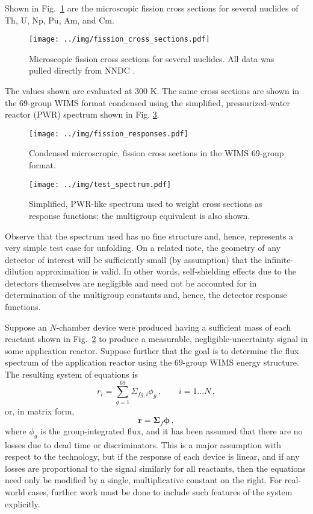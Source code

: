 \documentclass[journal]{IEEEtran}
\newcommand{\FIG}[1]{Fig.~\ref{#1}}               %
\begin{document}
Shown in \FIG{fig:reactants} are the microscopic fission cross sections for several nuclides of Th, U, Np, Pu, Am, and Cm.  
\begin{figure}[h!tb]
  \centering
  \texttt{[image: ../img/fission\_cross\_sections.pdf]}
  \caption{Microscopic fission cross sections for several nuclides.  All data was pulled directly from NNDC \cite{nndc}.}
  \label{fig:reactants}
\end{figure}
The values shown are evaluated at 300 K.  The same cross sections are shown in the 69-group WIMS \cite{stammler1984methods} format condensed using the simplified, pressurized-water reactor (PWR)  spectrum shown in Fig. \ref{fig:spectra}.  
\begin{figure}[h!tb]
  \centering
  \texttt{[image: ../img/fission\_responses.pdf]}
  \caption{Condensed microscropic, fission cross sections  in the WIMS 69-group format.}
  \label{fig:response}
\end{figure}
\begin{figure}[h!tb]
  \centering
  \texttt{[image: ../img/test\_spectrum.pdf]}
  \caption{Simplified, PWR-like spectrum used to weight cross sections as response functions; the multigroup equivalent is also shown.}
  \label{fig:spectra}
\end{figure}
Observe that the spectrum used has no fine structure and, hence, represents a very simple test case for unfolding.  On a related note, the geometry of any detector of interest will be sufficiently small (by assumption) that the infinite-dilution approximation is valid.  In other words, self-shielding effects due to the detectors themselves are negligible and need not be accounted for in determination of the multigroup constants and, hence, the detector response functions.

Suppose an $N$-chamber device were produced having a sufficient mass of each reactant shown in \FIG{fig:response} to produce a measurable, negligible-uncertainty signal in some application reactor.  Suppose further that the goal is to determine the flux spectrum of the application reactor using the 69-group WIMS energy structure.  The resulting system of equations is 
\begin{equation}
  r_i = \sum_{g=1}^{69} \Sigma_{fg,i}  \phi_g\, , 
    \qquad i = 1 \ldots N \, ,
\label{eq:response}
\end{equation}
or, in matrix form,
\begin{equation}
 \mathbf{r} = \bm{\Sigma}_f \bm{\phi} \, ,
\end{equation}
where $\phi_g$ is the group-integrated flux, and it has been assumed that there are no losses due to dead time or discriminators.   This is a major assumption with respect to the technology, but if the response of each device is linear, and if any losses are proportional to the signal similarly for all reactants, then the equations need only be modified by a single, multiplicative constant on the right.  For real-world cases, further work must be done to include such features of the system explicitly.
\end{document}
